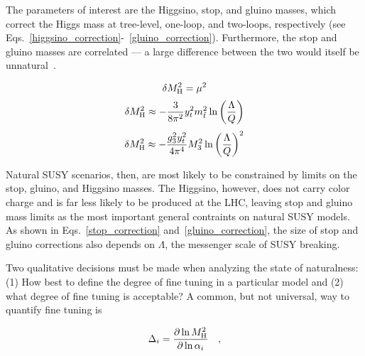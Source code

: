 \documentclass[12pt]{article}
\begin{document}
    The parameters of interest are the Higgsino, stop, and gluino masses, which correct the Higgs mass at tree-level, one-loop, and two-loops, respectively (see Eqs.~\ref{higgsino_correction}-~\ref{gluino_correction}). Furthermore, the stop and gluino masses are correlated --- a large difference between the two would itself be unnatural~\cite{cornering}.

    \noindent \begin{equation}
        \delta M_{\mathrm{H}}^2 = \mu^2
        \label{higgsino_correction}
    \end{equation}
    \noindent \begin{equation}
        \delta M_{\mathrm{H}}^2 \approx - \frac{3}{8\pi^2} y_t^2 m_{\tilde{t}}^2 \ln{\left(\frac{\Lambda}{Q}\right)}
        \label{stop_correction}
    \end{equation}
    \noindent \begin{equation}
        \delta M_{\mathrm{H}}^2 \approx - \frac{g_3^2 y_t^2}{4\pi^4} M_3^2 \ln{\left(\frac{\Lambda}{Q}\right)}^2
        \label{gluino_correction}
    \end{equation}

    Natural SUSY scenarios, then, are most likely to be constrained by limits on the stop, gluino, and Higgsino masses. The Higgsino, however, does not carry color charge and is far less likely to be produced at the LHC, leaving stop and gluino mass limits as the most important general contraints on natural SUSY models. As shown in Eqs.~\ref{stop_correction} and~\ref{gluino_correction}, the size of stop and gluino corrections also depends on $\Lambda$, the messenger scale of SUSY breaking.

    Two qualitative decisions must be made when analyzing the state of naturalness: (1) How best to define the degree of fine tuning in a particular model and (2) what degree of fine tuning is acceptable? A common, but not universal, way to quantify fine tuning is
    
    \noindent \begin{equation}
        \Delta_i = \frac{\partial \ln{M_{\mathrm{H}}^2}}{\partial \ln{\alpha_i}} \quad ,
        \label{fine_tuning}
    \end{equation}
\end{document}
